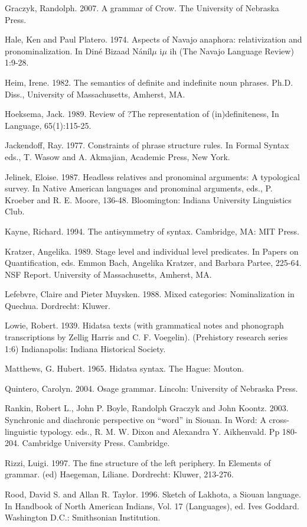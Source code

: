 \documentclass[output=paper]{LSP/langsci}
\begin{document}
\begin{reflist}
Graczyk, Randolph. 2007. A grammar of Crow. The University of Nebraska Press.

Hale, Ken and Paul Platero. 1974. Aspects of Navajo anaphora: relativization and pronominalization.  In Din\'e Bizaad N\'an\'il$\mu$ i$\mu$ ih (The Navajo Language Review) 1:9-28.

Heim, Irene. 1982. The semantics of definite and indefinite noun phrases. Ph.D. Diss., University of Massachusetts, Amherst, MA.

Hoeksema, Jack. 1989. Review of ?The representation of (in)definiteness, In Language, 65(1):115-25.

Jackendoff, Ray. 1977. Constraints of phrase structure rules. In Formal Syntax  eds., T. Wasow and A. Akmajian, Academic Press, New York.

Jelinek, Eloise. 1987. Headless relatives and pronominal arguments: A typological survey. In Native American languages and pronominal arguments, eds., P. Kroeber and R. E. Moore, 136-48. Bloomington: Indiana University Linguistics Club.

Kayne, Richard. 1994. The antisymmetry of syntax. Cambridge, MA: MIT Press. 

Kratzer, Angelika. 1989. Stage level and individual level predicates.  In Papers on Quantification, eds. Emmon Bach, Angelika Kratzer, and Barbara Partee, 225-64. NSF Report. University of Massachusetts, Amherst, MA.

Lefebvre, Claire and Pieter Muysken. 1988. Mixed categories: Nominalization in Quechua. Dordrecht: Kluwer.

Lowie, Robert. 1939. Hidatsa texts (with grammatical notes and phonograph transcriptions by Zellig Harris and C. F. Voegelin). (Prehistory research series 1:6) Indianapolis: Indiana Historical Society.

Matthews, G. Hubert. 1965. Hidatsa syntax. The Hague: Mouton.

Quintero, Carolyn. 2004. Osage grammar. Lincoln: University of Nebraska Press.

Rankin, Robert L., John P. Boyle, Randolph Graczyk and John Koontz. 2003. Synchronic and diachronic perspective on ``word'' in Siouan. In Word: A cross-linguistic typology. eds., R. M. W. Dixon and Alexandra Y. Aikhenvald. Pp 180-204. Cambridge University Press. Cambridge.

Rizzi, Luigi. 1997. The fine structure of the left periphery. In Elements of grammar. (ed) Haegeman, Liliane. Dordrecht: Kluwer, 213-276.

Rood, David S. and Allan R. Taylor. 1996.  Sketch of Lakhota, a Siouan language. In Handbook of North American Indians, Vol. 17 (Languages), ed. Ives Goddard. Washington D.C.: Smithsonian Institution.


\end{reflist}
\end{document}
